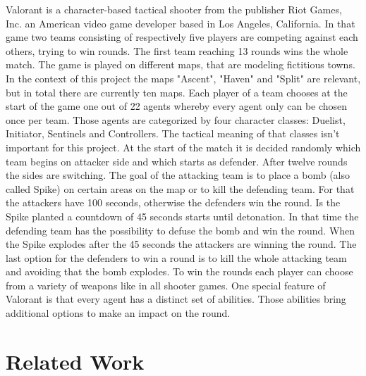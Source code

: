 Valorant is a character-based tactical shooter from the publisher Riot Games, Inc. an American 
video game developer based in Los Angeles, California. In that game two teams consisting of 
respectively five players are competing against each others, trying to win rounds. The first team 
reaching 13 rounds wins the whole match. The game is played on different maps, that are modeling
fictitious towns. In the context of this project the maps "Ascent", "Haven" and "Split" are relevant, 
but in total there are currently ten maps. Each player of a team chooses at the start of the game one 
out of 22 agents whereby every agent only can be chosen once per team. Those agents are 
categorized by four character classes: Duelist, Initiator, Sentinels and Controllers. The tactical 
meaning of that classes isn't important for this project. At the start of the match it is decided 
randomly which team begins on attacker side and which starts as defender. After twelve rounds the 
sides are switching. The goal of the attacking team is to place a bomb (also called Spike) on certain 
areas on the map or to kill the defending team. For that the attackers have 100 seconds, otherwise 
the defenders win the round. Is the Spike planted a countdown of 45 seconds starts until detonation. 
In that time the defending team has the possibility to defuse the bomb and win the round. When the 
Spike explodes after the 45 seconds the attackers are winning the round. The last option for the 
defenders to win a round is to kill the whole attacking team and avoiding that the bomb explodes. To 
win the rounds each player can choose from a variety of weapons like in all shooter games. One 
special feature of Valorant is that every agent has a distinct set of abilities. Those abilities bring 
additional options to make an impact on the round.

\section{Related Work}\label{sec:intro:relatedWork}
